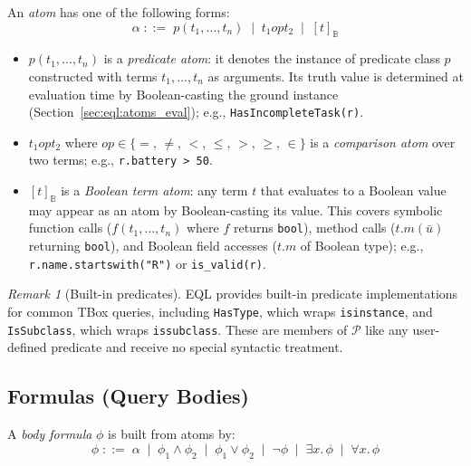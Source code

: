\documentclass[11pt, a4paper]{article}
\theoremstyle{plain}
\theoremstyle{definition}
\theoremstyle{remark}
\newtheorem{remark}[theorem]{Remark}
\begin{document}
An \emph{atom} has one of the following forms:
\[
  \alpha \;::=\;
    p(t_1, \ldots, t_n)
  \;\mid\;
    t_1 \mathbin{\mathit{op}} t_2
  \;\mid\;
    [t]_\mathbb{B}
\]

\begin{itemize}
  \item $p(t_1,\ldots,t_n)$ is a \emph{predicate atom}: it denotes the instance of predicate
        class $p$ constructed with terms $t_1,\ldots,t_n$ as arguments.  Its truth value is
        determined at evaluation time by Boolean-casting the ground instance
        (Section~\ref{sec:eql:atoms_eval}); e.g., \texttt{HasIncompleteTask(r)}.

  \item $t_1 \mathbin{\mathit{op}} t_2$ where
        $\mathit{op}\in\{=,\,\neq,\,<,\,\leq,\,>,\,\geq,\,\in\}$ is a \emph{comparison atom}
        over two terms; e.g., \texttt{r.battery > 50}.

  \item $[t]_\mathbb{B}$ is a \emph{Boolean term atom}: any term $t$ that evaluates to a
        Boolean value may appear as an atom by Boolean-casting its value.  This covers symbolic
        function calls ($f(t_1,\ldots,t_n)$ where $f$ returns \texttt{bool}), method calls
        ($t.m(\bar{u})$ returning \texttt{bool}), and Boolean field accesses ($t.m$ of Boolean
        type); e.g., \texttt{r.name.startswith("R")} or \texttt{is\_valid(r)}.
\end{itemize}

\begin{remark}[Built-in predicates]
EQL provides built-in predicate implementations for common TBox queries, including
\texttt{HasType}, which wraps \texttt{isinstance}, and \texttt{IsSubclass}, which wraps
\texttt{issubclass}.  These are members of $\mathcal{P}$ like any user-defined predicate and
receive no special syntactic treatment.
\end{remark}

\subsection{Formulas (Query Bodies)}

A \emph{body formula} $\phi$ is built from atoms by:
\[
  \phi \;::=\;
    \alpha
  \;\mid\; \phi_1 \wedge \phi_2
  \;\mid\; \phi_1 \vee \phi_2
  \;\mid\; \neg\phi
  \;\mid\; \exists x.\,\phi
  \;\mid\; \forall x.\,\phi
\]
\end{document}
